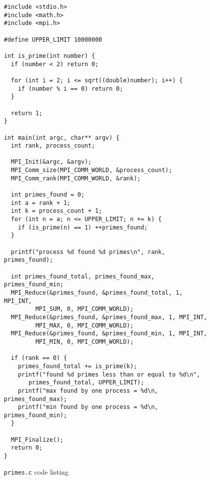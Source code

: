 \begin{figure}
\begin{Verbatim}[frame=single]
#include <stdio.h>
#include <math.h>
#include <mpi.h>

#define UPPER_LIMIT 10000000

int is_prime(int number) {
  if (number < 2) return 0;

  for (int i = 2; i <= sqrt((double)number); i++) {
    if (number % i == 0) return 0;
  }

  return 1;
}

int main(int argc, char** argv) {
  int rank, process_count;

  MPI_Init(&argc, &argv);
  MPI_Comm_size(MPI_COMM_WORLD, &process_count);
  MPI_Comm_rank(MPI_COMM_WORLD, &rank);

  int primes_found = 0;
  int a = rank + 1;
  int k = process_count + 1;
  for (int n = a; n <= UPPER_LIMIT; n += k) {
    if (is_prime(n) == 1) ++primes_found;
  }

  printf("process %d found %d primes\n", rank, primes_found);

  int primes_found_total, primes_found_max, primes_found_min;
  MPI_Reduce(&primes_found, &primes_found_total, 1, MPI_INT,
	     MPI_SUM, 0, MPI_COMM_WORLD);
  MPI_Reduce(&primes_found, &primes_found_max, 1, MPI_INT,
	     MPI_MAX, 0, MPI_COMM_WORLD);
  MPI_Reduce(&primes_found, &primes_found_min, 1, MPI_INT,
	     MPI_MIN, 0, MPI_COMM_WORLD);

  if (rank == 0) {
    primes_found_total += is_prime(k);
    printf("found %d primes less than or equal to %d\n",
	   primes_found_total, UPPER_LIMIT);
    printf("max found by one process = %d\n, primes_found_max);
    printf("min found by one process = %d\n, primes_found_min);
  }

  MPI_Finalize();
  return 0;
}
\end{Verbatim}
    \caption{\texttt{primes.c} code listing}
    \label{code:primes}
\end{figure}